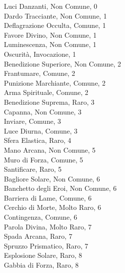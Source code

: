 \begin{multicols}{3}
Luci Danzanti, Non Comune, 0\\
Dardo Tracciante, Non Comune, 1\\
Deflagrazione Occulta, Comune, 1\\
Favore Divino, Non Comune, 1\\
Luminescenza, Non Comune, 1\\
Oscurità, Invocazione, 1\\
Benedizione Superiore, Non Comune, 2\\
Frantumare, Comune, 2\\
Punizione Marchiante, Comune, 2\\
Arma Spirituale, Comune, 2\\
Benedizione Suprema, Raro, 3\\
Capanna, Non Comune, 3\\
Inviare, Comune, 3\\
Luce Diurna, Comune, 3\\
Sfera Elastica, Raro, 4\\
Mano Arcana, Non Comune, 5\\
Muro di Forza, Comune, 5\\
Santificare, Raro, 5\\
Bagliore Solare, Non Comune, 6\\
Banchetto degli Eroi, Non Comune, 6\\
Barriera di Lame, Comune, 6\\
Cerchio di Morte, Molto Raro, 6\\
Contingenza, Comune, 6\\
Parola Divina, Molto Raro, 7\\
Spada Arcana, Raro, 7\\
Spruzzo Prismatico, Raro, 7\\
Esplosione Solare, Raro, 8\\
Gabbia di Forza, Raro, 8\\



\end{multicols}
